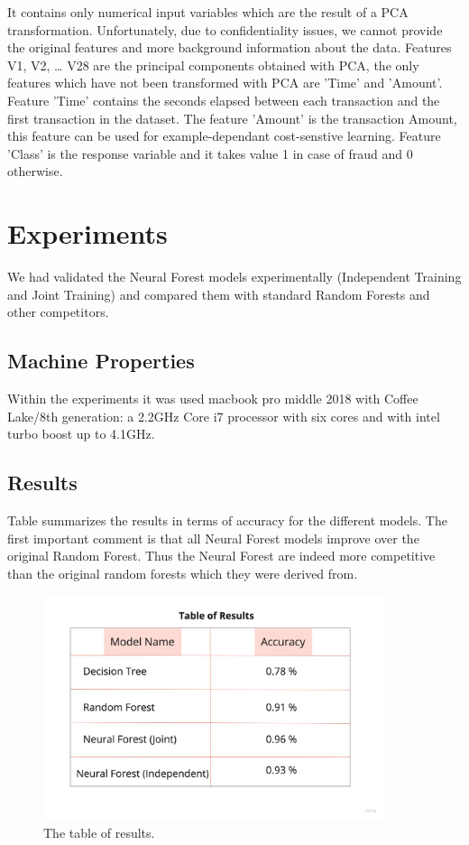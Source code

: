 \documentclass{article}
\begin{document}
It contains only numerical input variables which are the result of a PCA transformation. Unfortunately, due to confidentiality issues, we cannot provide the original features and more background information about the data. Features V1, V2, … V28 are the principal components obtained with PCA, the only features which have not been transformed with PCA are 'Time' and 'Amount'. Feature 'Time' contains the seconds elapsed between each transaction and the first transaction in the dataset. The feature 'Amount' is the transaction Amount, this feature can be used for example-dependant cost-senstive learning. Feature 'Class' is the response variable and it takes value 1 in case of fraud and 0 otherwise.

\section{Experiments}
We had validated the Neural Forest models experimentally (Independent Training  and Joint Training) and compared them with standard Random Forests and other competitors. 

\subsection{Machine Properties}
Within the experiments it was used macbook pro middle 2018 with Coffee Lake/8th generation: a 2.2GHz Core i7 processor with six cores and with intel turbo boost up to 4.1GHz.

\subsection{Results}
Table summarizes the results in terms of accuracy for the different models. The first important comment is that all Neural Forest models improve over the original Random Forest. Thus the Neural Forest are indeed more competitive than the original random forests which they were derived from. 
\begin{figure}[h]
    \centering \includegraphics[width=10cm]{images/TableofResults.jpg}
    \caption {The table of results.}
    \label{fig:ct_spine}
\end{figure}
\end{document}
